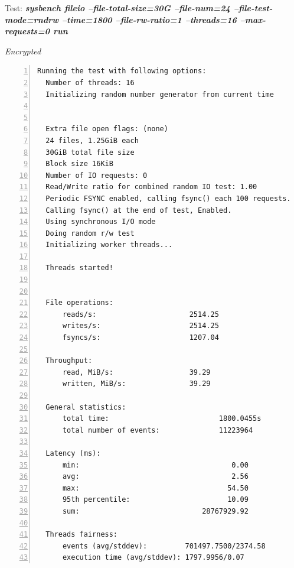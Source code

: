 \newpage
\begin{center}
  Test: \textbf{\textit{sysbench fileio --file-total-size=30G --file-num=24 --file-test-mode=rndrw --time=1800 --file-rw-ratio=1 --threads=16 --max-requests=0 run}}  
\end{center}
\vspace*{-\baselineskip}
\noindent\begin{minipage}[t]{0.45\linewidth}
  \centering
  \textit{Encrypted}
  \begin{lstlisting}[basicstyle=\tiny,frame=single, numbers=left, label=cpu_test1]
  Running the test with following options:
  Number of threads: 16
  Initializing random number generator from current time
  
  
  Extra file open flags: (none)
  24 files, 1.25GiB each
  30GiB total file size
  Block size 16KiB
  Number of IO requests: 0
  Read/Write ratio for combined random IO test: 1.00
  Periodic FSYNC enabled, calling fsync() each 100 requests.
  Calling fsync() at the end of test, Enabled.
  Using synchronous I/O mode
  Doing random r/w test
  Initializing worker threads...
  
  Threads started!
  
  
  File operations:
      reads/s:                      2514.25
      writes/s:                     2514.25
      fsyncs/s:                     1207.04
  
  Throughput:
      read, MiB/s:                  39.29
      written, MiB/s:               39.29
  
  General statistics:
      total time:                          1800.0455s
      total number of events:              11223964
  
  Latency (ms):
      min:                                    0.00
      avg:                                    2.56
      max:                                   54.50
      95th percentile:                       10.09
      sum:                             28767929.92
  
  Threads fairness:
      events (avg/stddev):         701497.7500/2374.58
      execution time (avg/stddev): 1797.9956/0.07
  \end{lstlisting}
\end{minipage}
\hspace{0.5cm}
